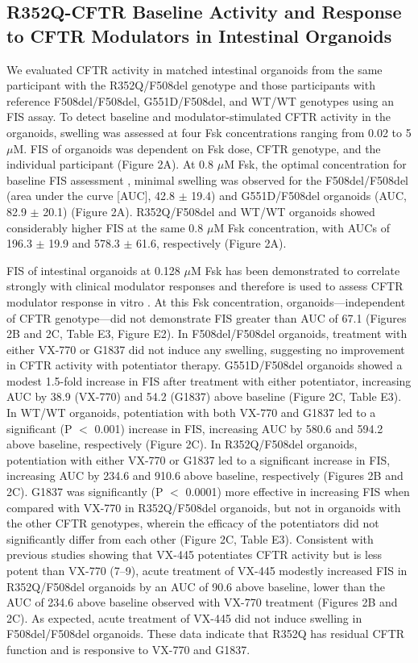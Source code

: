 \subsection{R352Q-CFTR Baseline Activity and Response to CFTR Modulators in Intestinal Organoids}

We evaluated CFTR activity in matched intestinal organoids from the same participant with the R352Q/F508del genotype and those participants with reference F508del/F508del, G551D/F508del, and WT/WT genotypes using an FIS assay. To detect baseline and modulator-stimulated CFTR activity in the organoids, swelling was assessed at four Fsk concentrations ranging from 0.02 to 5 $\mu$M. FIS of organoids was dependent on Fsk dose, CFTR genotype, and the individual participant (Figure 2A). At 0.8 $\mu$M Fsk, the optimal concentration for baseline FIS assessment \cite{dekkers2016}, minimal swelling was observed for the F508del/F508del (area under the curve [AUC], 42.8 $\pm$ 19.4) and G551D/F508del organoids (AUC, 82.9 $\pm$ 20.1) (Figure 2A). R352Q/F508del and WT/WT organoids showed considerably higher FIS at the same 0.8 $\mu$M Fsk concentration, with AUCs of 196.3 $\pm$ 19.9 and 578.3 $\pm$ 61.6, respectively (Figure 2A).



FIS of intestinal organoids at 0.128 $\mu$M Fsk has been demonstrated to correlate strongly with clinical modulator responses and therefore is used to assess CFTR modulator response in vitro \cite{dekkers2016}. At this Fsk concentration, organoids—independent of CFTR genotype—did not demonstrate FIS greater than AUC of 67.1 (Figures 2B and 2C, Table E3, Figure E2). In F508del/F508del organoids, treatment with either VX-770 or G1837 did not induce any swelling, suggesting no improvement in CFTR activity with potentiator therapy. G551D/F508del organoids showed a modest 1.5-fold increase in FIS after treatment with either potentiator, increasing AUC by 38.9 (VX-770) and 54.2 (G1837) above baseline (Figure 2C, Table E3). In WT/WT organoids, potentiation with both VX-770 and G1837 led to a significant (P $<$ 0.001) increase in FIS, increasing AUC by 580.6 and 594.2 above baseline, respectively (Figure 2C). In R352Q/F508del organoids, potentiation with either VX-770 or G1837 led to a significant increase in FIS, increasing AUC by 234.6 and 910.6 above baseline, respectively (Figures 2B and 2C). G1837 was significantly (P $<$ 0.0001) more effective in increasing FIS when compared with VX-770 in R352Q/F508del organoids, but not in organoids with the other CFTR genotypes, wherein the efficacy of the potentiators did not significantly differ from each other (Figure 2C, Table E3). Consistent with previous studies showing that VX-445 potentiates CFTR activity but is less potent than VX-770 (7–9), acute treatment of VX-445 modestly increased FIS in R352Q/F508del organoids by an AUC of 90.6 above baseline, lower than the AUC of 234.6 above baseline observed with VX-770 treatment (Figures 2B and 2C). As expected, acute treatment of VX-445 did not induce swelling in F508del/F508del organoids. These data indicate that R352Q has residual CFTR function and is responsive to VX-770 and G1837.

